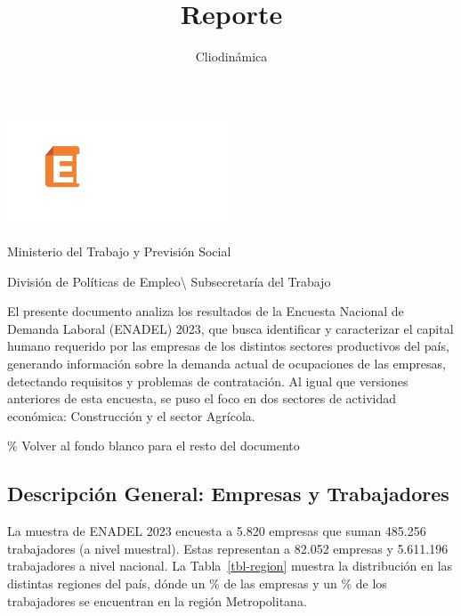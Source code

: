 \documentclass[
  14pt,
]{article}
\title{Reporte}
\author{Cliodinámica}
\date{}
\renewcommand*\contentsname{Tabla de contenidos}
\newcommand\contentsname{Tabla de contenidos}
\begin{document}
\maketitle


\newpage

\pagecolor{mybgcolor} 
\color{white}

\centering

\includegraphics[width=0.5\textwidth]{../Logotipo ENADEL/Logotipo ENADEL 2023.png}
\vspace{2cm}

\noindent Ministerio del Trabajo y Previsión Social

División de Políticas de Empleo\textbackslash{} Subsecretaría del
Trabajo

\justifying

El presente documento analiza los resultados de la Encuesta Nacional de
Demanda Laboral (ENADEL) 2023, que busca identificar y caracterizar el
capital humano requerido por las empresas de los distintos sectores
productivos del país, generando información sobre la demanda actual de
ocupaciones de las empresas, detectando requisitos y problemas de
contratación. Al igual que versiones anteriores de esta encuesta, se
puso el foco en dos sectores de actividad económica: Construcción y el
sector Agrícola.

\newpage

\pagecolor{white} \% Volver al fondo blanco para el resto del documento
\color{black}

\newpage
\renewcommand{\contentsname}{Índice} 
\tableofcontents

\newpage

\subsection{Descripción General: Empresas y
Trabajadores}\label{descripciuxf3n-general-empresas-y-trabajadores}

La muestra de ENADEL 2023 encuesta a 5.820 empresas que suman 485.256
trabajadores (a nivel muestral). Estas representan a 82.052 empresas y
5.611.196 trabajadores a nivel nacional. La Tabla~\ref{tbl-region}
muestra la distribución en las distintas regiones del país, dónde un
\% de las empresas y un \% de los trabajadores se
encuentran en la región Metropolitana.
\end{document}
